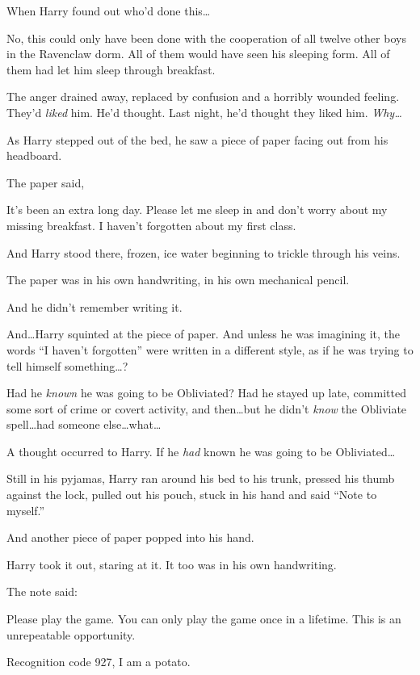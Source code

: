 When Harry found out who’d done this…

No, this could only have been done with the cooperation of all twelve other boys in the Ravenclaw dorm. All of them would have seen his sleeping form. All of them had let him sleep through breakfast.

The anger drained away, replaced by confusion and a horribly wounded feeling. They’d \emph{liked} him. He’d thought. Last night, he’d thought they liked him. \emph{Why…}

As Harry stepped out of the bed, he saw a piece of paper facing out from his headboard.

The paper said,

\begin{writtenNote}

It’s been an extra long day. Please let me sleep in and don’t worry about my missing breakfast. I haven’t forgotten about my first class.

\end{writtenNote}

And Harry stood there, frozen, ice water beginning to trickle through his veins.

The paper was in his own handwriting, in his own mechanical pencil.

And he didn’t remember writing it.

And…Harry squinted at the piece of paper. And unless he was imagining it, the words “I haven’t forgotten” were written in a different style, as if he was trying to tell himself something…?

Had he \emph{known} he was going to be Obliviated? Had he stayed up late, committed some sort of crime or covert activity, and then…but he didn’t \emph{know} the Obliviate spell…had someone else…what…

A thought occurred to Harry. If he \emph{had} known he was going to be Obliviated…

Still in his pyjamas, Harry ran around his bed to his trunk, pressed his thumb against the lock, pulled out his pouch, stuck in his hand and said “Note to myself.”

And another piece of paper popped into his hand.

Harry took it out, staring at it. It too was in his own handwriting.

The note said:

\begin{writtenNote}

Please play the game. You can only play the game once in a lifetime. This is an unrepeatable opportunity.

Recognition code 927, I am a potato.

\end{writtenNote}

